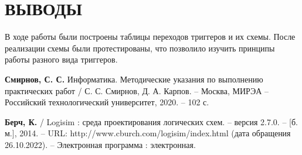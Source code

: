 \documentclass{mirea}
\begin{document}
\chapter{ВЫВОДЫ}
В ходе работы были построены таблицы переходов триггеров и их схемы. После реализации схемы были протестированы, что позволило изучить принципы работы разного вида триггеров.
	
\begin{thebibliography}{99}
	 \textbf{Смирнов, С. С.} Информатика. Методические указания по выполнению практических работ / С. С. Смирнов, Д. А. Карпов. – Москва, МИРЭА – Российский технологический университет, 2020. – 102 с.
	
	 \textbf{Берч, К.} / Logisim : среда проектирования логических схем. -- версия 2.7.0. -- [б. м.], 2014. -- URL: http://www.cburch.com/logisim/index.html (дата обращения 26.10.2022). -- Электронная программа : электронная.
\end{thebibliography}
	
\end{document}
